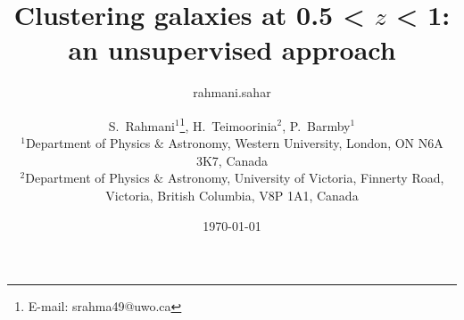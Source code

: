 \documentclass[useAMS,usenatbib]{mn2e}
\begin{document}

\title[SOM: classifying high $Z$ galaxies]{Clustering galaxies at 0.5 < $z$ < 1: an unsupervised approach} %
\author{rahmani.sahar }
\date{\today}
\author[S.~Rahmani, H.~Teimoorinia and P.~Barmby]{S.~Rahmani$^{1}$\thanks{E-mail:
srahma49@uwo.ca}, H.~Teimoorinia$^{2}$, P.~Barmby$^{1}$\\
$^{1}$Department of Physics $\&$ Astronomy, Western University, London, ON N6A 3K7, Canada\\
$^{2}$Department of Physics $\&$ Astronomy, University of Victoria, Finnerty Road, Victoria, British Columbia, V8P 1A1, Canada}
\maketitle

\end{document}
